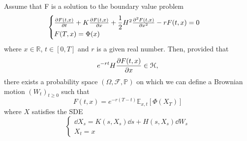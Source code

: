 \begin{theorem}
    Assume that F is a solution to the boundary value problem
    \begin{equation}\label{bvp1}
        \begin{cases}
        \pdv{F(t,x)}{t} + K\pdv{F(t,x)}{x} + \dfrac{1}{2}H^2\pdv[2]{F(t,x)}{x}-rF(t,x)=0\\
        F(T,x) = \Phi(x)
        \end{cases}
    \end{equation}
    where $x\in\mathbb{R}$, $t\in[0,T]$ and $r$ is a given real number. Then, provided that $$e^{-rt}H\pdv{F(t,x)}{x}\in\mathcal{H},$$ 
    there exists a probability space $(\Omega,\mathcal{F},\mathbb{P})$ on which we can define a Brownian motion $(W_t)_{t\ge0}$ such that
    \begin{equation}
        F(t,x) = e^{-r(T-t)}\mathbb{E}_{x,t}[\Phi(X_T)]
    \end{equation}
    where $X$ satisfies the SDE
    \begin{equation}\label{fk1}
        \begin{cases}
        \dd X_s = K(s, X_s)\dd s + H(s, X_s)\dd W_s\\
        X_t = x
        \end{cases}
    \end{equation}
\end{theorem}
